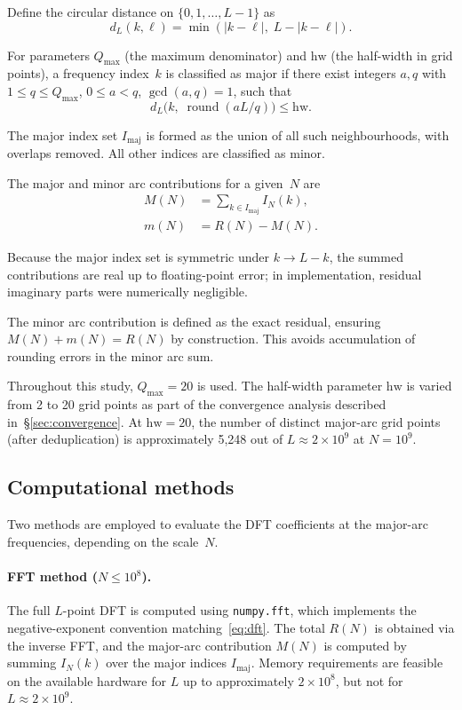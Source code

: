 \documentclass[11pt,a4paper]{article}
\newcommand{\RN}{R(N)}
\newcommand{\MN}{M(N)}
\newcommand{\mN}{m(N)}
\newcommand{\IN}{I_N(k)}
\newcommand{\Qmax}{Q_{\max}}
\begin{document}
Define the circular distance on $\{0, 1, \ldots, L-1\}$ as
\begin{equation}
d_L(k, \ell) = \min(|k - \ell|,\; L - |k - \ell|).
\end{equation}

For parameters $\Qmax$ (the maximum denominator) and $\mathrm{hw}$ (the half-width in grid points), a frequency index~$k$ is classified as major if there exist integers $a, q$ with $1 \leq q \leq \Qmax$, $0 \leq a < q$, $\gcd(a,q) = 1$, such that
\begin{equation}
d_L\!\bigl(k,\; \operatorname{round}(aL/q)\bigr) \leq \mathrm{hw}.
\end{equation}

The major index set $I_{\mathrm{maj}}$ is formed as the union of all such neighbourhoods, with overlaps removed. All other indices are classified as minor.

The major and minor arc contributions for a given~$N$ are
\begin{align}
\MN &= \sum_{k \in I_{\mathrm{maj}}} \IN, \\
\mN &= \RN - \MN.
\end{align}

Because the major index set is symmetric under $k \to L - k$, the summed contributions are real up to floating-point error; in implementation, residual imaginary parts were numerically negligible.

The minor arc contribution is defined as the exact residual, ensuring $\MN + \mN = \RN$ by construction. This avoids accumulation of rounding errors in the minor arc sum.

Throughout this study, $\Qmax = 20$ is used. The half-width parameter $\mathrm{hw}$ is varied from 2 to 20 grid points as part of the convergence analysis described in~\S\ref{sec:convergence}. At $\mathrm{hw} = 20$, the number of distinct major-arc grid points (after deduplication) is approximately 5{,}248 out of $L \approx 2 \times 10^9$ at $N = 10^9$.


\subsection{Computational methods}

Two methods are employed to evaluate the DFT coefficients at the major-arc frequencies, depending on the scale~$N$.

\paragraph{FFT method ($N \leq 10^8$).}
The full $L$-point DFT is computed using \texttt{numpy.fft}, which implements the negative-exponent convention matching~\eqref{eq:dft}. The total $\RN$ is obtained via the inverse FFT, and the major-arc contribution $\MN$ is computed by summing $\IN$ over the major indices $I_{\mathrm{maj}}$. Memory requirements are feasible on the available hardware for $L$ up to approximately $2 \times 10^8$, but not for $L \approx 2 \times 10^9$.
\end{document}
